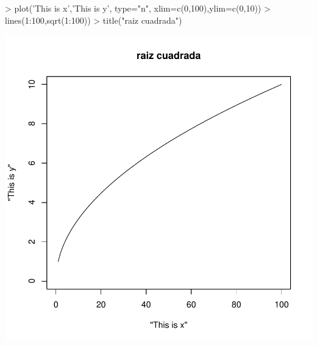 \documentclass[12pt]{article}
\begin{document}
\begin{Schunk}
\begin{Sinput}
> plot('This is x','This is y', type="n", xlim=c(0,100),ylim=c(0,10))
> lines(1:100,sqrt(1:100))
> title("raiz cuadrada")
\end{Sinput}
\end{Schunk}
\includegraphics{ensayo-015}
\end{document}

